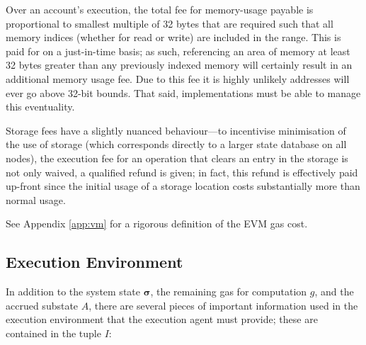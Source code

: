 \documentclass[9pt,oneside]{amsart}
\makeatletter
\newcommand{\linkdest}[1]{\Hy@raisedlink{\hypertarget{#1}{}}}
\makeatother
\begin{document}
\begin{multicols}{2}
Over an account's execution, the total fee for memory-usage payable is proportional to smallest multiple of 32 bytes that are required such that all memory indices (whether for read or write) are included in the range. This is paid for on a just-in-time basis; as such, referencing an area of memory at least 32 bytes greater than any previously indexed memory will certainly result in an additional memory usage fee. Due to this fee it is highly unlikely addresses will ever go above 32-bit bounds. That said, implementations must be able to manage this eventuality.

Storage fees have a slightly nuanced behaviour---to incentivise minimisation of the use of storage (which corresponds directly to a larger state database on all nodes), the execution fee for an operation that clears an entry in the storage is not only waived, a qualified refund is given; in fact, this refund is effectively paid up-front since the initial usage of a storage location costs substantially more than normal usage.

See Appendix \ref{app:vm} for a rigorous definition of the EVM gas cost.

\subsection{Execution Environment}\linkdest{exec_env}

In addition to the system state $\boldsymbol{\sigma}$, the remaining gas for computation $g$, and the accrued substate $A$,
there are several pieces of important information used in the execution environment that the execution agent must provide; these are contained in the tuple $I$:


\end{multicols}
\end{document}
